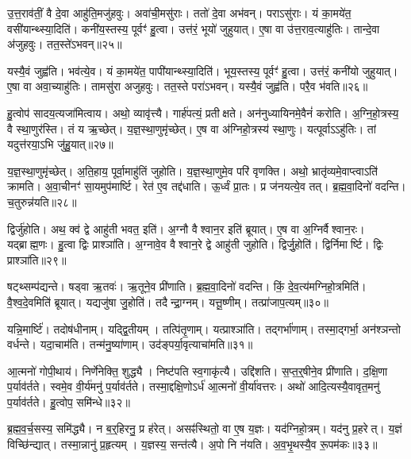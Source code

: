 उ॒त्त॒राव॑तीं॒ वै दे॒वा आहु॑ति॒मजु॑हवुः।
अवा॑ची॒मसु॑राः।
ततो॑ दे॒वा अभ॑वन्।
पराऽसु॑राः।
यं का॒मये॑त॒ वसी॑यान्थ्स्या॒दिति॑।
कनी॑य॒स्तस्य॒ पूर्वꣳ॑ हु॒त्वा।
उत्त॑रं॒ भूयो॑ जुहुयात्।
ए॒षा वा उ॑त्त॒राव॒त्याहु॑तिः।
तान्दे॒वा अ॑जुहवुः।
तत॒स्ते॑\-ऽभवन्॥२५॥

यस्यै॒वं जुह्व॑ति।
भव॑त्ये॒व।
यं का॒मये॑त॒ पापी॑यान्थ्स्या॒दिति॑।
भूय॒स्तस्य॒ पूर्वꣳ॑ हु॒त्वा।
उत्त॑रं॒ कनी॑यो जुहुयात्।
ए॒षा वा अवा॒च्याहु॑तिः।
तामसु॑रा अजुहवुः।
तत॒स्ते परा॑\-ऽभवन्।
यस्यै॒वं जुह्व॑ति।
परै॒व भ॑वति॥२६॥

हु॒त्वोप॑ सादय॒त्यजा॑मित्वाय।
अथो॒ व्यावृ॑त्त्यै।
गार्\mbox{}ह॑पत्यं॒ प्रतीक्षते।
अन॑नुध्यायिनमे॒वैनं॑ करोति।
अ॒ग्नि॒हो॒त्रस्य॒ वै स्था॒णुर॑स्ति।
तं य ऋ॒च्छेत्।
य॒ज्ञ॒स्था॒णुमृ॑च्छेत्।
ए॒ष वा अ॑ग्निहो॒त्रस्य॑ स्था॒णुः।
यत्पूर्वा\-ऽऽहु॑तिः।
तां यदुत्त॑रया॒ऽभि जु॑हु॒यात्॥२७॥

य॒ज्ञ॒स्था॒णुमृ॑च्छेत्।
अ॒ति॒हाय॒ पूर्वा॒माहु॑तिं जुहोति।
य॒ज्ञ॒स्था॒णुमे॒व परि॑ वृणक्ति।
अथो॒ भ्रातृ॑व्यमे॒वाप्त्वाऽति॑ क्रामति।
अ॒वा॒चीनꣳ॑ सा॒यमुप॑मार्ष्टि।
रेत॑ ए॒व तद्द॑धाति।
ऊ॒र्ध्वं प्रा॒तः।
प्र ज॑नयत्ये॒व तत्।
ब्र॒ह्म॒वा॒दिनो॑ वदन्ति।
च॒तुरुन्न॑यति॥२८॥

द्विर्जु॑होति।
अथ॒ क्व॑ द्वे आहु॑ती भवत॒ इति॑।
अ॒ग्नौ वैश्वान॒र इति॑ ब्रूयात्।
ए॒ष वा अ॒ग्निर्वैश्वान॒रः।
यद्ब्राह्म॒णः।
हु॒त्वा द्विः प्राश्ञा॑ति।
अ॒ग्नावे॒व वैश्वान॒रे द्वे आहु॑ती जुहोति।
द्विर्जु॒होति॑।
द्विर्निमार्ष्टि।
द्विः प्राश्ञा॑ति॥२९॥

षट्थ्सम्प॑द्यन्ते।
षड्वा ऋ॒तवः॑।
ऋ॒तूने॒व प्री॑णाति।
ब्र॒ह्म॒वा॒दिनो॑ वदन्ति।
किं॒ दे॒व॒त्य॑मग्निहो॒त्रमिति॑।
वै॒श्व॒दे॒वमिति॑ ब्रूयात्।
यद्यजु॑षा जु॒होति॑।
तदैन्द्रा॒ग्नम्।
यत्तू॒ष्णीम्।
तत्प्रा॑जाप॒त्यम्॥३०॥

यन्नि॒मार्ष्टि॑।
तदोष॑धीनाम्।
यद्द्वि॒तीयम्।
तत्पि॑तृ॒णाम्।
यत्प्राश्ञा॑ति।
तद्गर्भा॑णाम्।
तस्मा॒द्गर्भा॒ अन॑श्ञन्तो वर्धन्ते।
यदा॒चाम॑ति।
तन्म॑नु॒ष्या॑णाम्।
उद॑ङ्पर्या॒वृत्याचा॑मति॥३१॥

आ॒त्मनो॑ गोपी॒थाय॑।
निर्णे॑नेक्ति॒ शुद्ध्यै।
निष्ट॑पति स्व॒गाकृ॑त्यै।
उद्दि॑शति।
स॒प्त॒र्॒षीने॒व प्री॑णाति।
द॒क्षि॒णा प॒र्याव॑र्तते।
स्वमे॒व वी॒र्य॑मनु॑ प॒र्याव॑र्तते।
तस्मा॒द्दक्षि॒णो\-ऽर्ध॑ आ॒त्मनो॑ वी॒र्या॑वत्तरः।
अथो॑ आदि॒त्यस्यै॒वावृत॒मनु॑ प॒र्याव॑र्तते।
हु॒त्वोप॒ समि॑न्धे॥३२॥

ब्र॒ह्म॒व॒र्च॒सस्य॒ समि॑द्ध्यै।
न ब॒र्॒हिरनु॒ प्र ह॑रेत्।
असꣴ॑स्थितो॒ वा ए॒ष य॒ज्ञः।
यद॑ग्निहो॒त्रम्।
यद॑नु प्र॒हरेत्।
य॒ज्ञं विच्छि॑न्द्यात्।
तस्मा॒न्नानु॑ प्र॒हृत्यम्।
य॒ज्ञस्य॒ सन्त॑त्यै।
अ॒पो नि न॑यति।
अ॒व॒भृ॒थस्यै॒व रू॒पम॑कः॥३३॥\anuvakamend[अ॒भ॒व॒न्भ॒व॒ति॒ जु॒हु॒यान्न॑यति मार्ष्टि॒ द्विः प्राश्ञा॑ति प्राजाप॒त्यमाचा॑मतीन्धे\-ऽकः]

